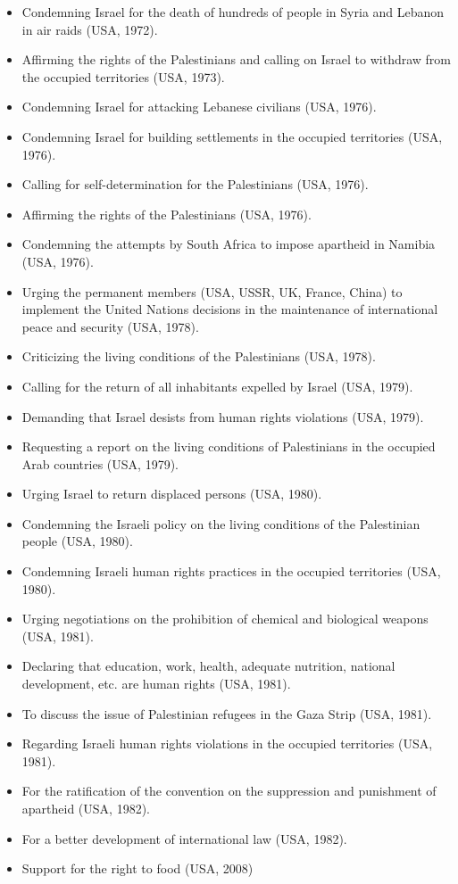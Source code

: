 \begin{itemize}
\item Condemning Israel for the death of hundreds of people in Syria and
Lebanon in air raids (USA, 1972).
\item Affirming the rights of the Palestinians and calling on Israel to
withdraw from the occupied territories (USA, 1973).
\item Condemning Israel for attacking Lebanese civilians (USA, 1976).
\item Condemning Israel for building settlements in the occupied territories
(USA, 1976).
\item Calling for self-determination for the Palestinians (USA, 1976).
\item Affirming the rights of the Palestinians (USA, 1976).
\item Condemning the attempts by South Africa to impose apartheid in Namibia
(USA, 1976).
\item Urging the permanent members (USA, USSR, UK, France, China) to
implement the United Nations decisions in the maintenance of international
peace and security (USA, 1978).
\item Criticizing the living conditions of the Palestinians (USA, 1978).
\item Calling for the return of all inhabitants expelled by Israel
(USA, 1979).
\item Demanding that Israel desists from human rights violations (USA, 1979).
\item Requesting a report on the living conditions of Palestinians in the
occupied Arab countries (USA, 1979).
\item Urging Israel to return displaced persons (USA, 1980).
\item Condemning the Israeli policy on the living conditions of the
Palestinian people (USA, 1980).
\item Condemning Israeli human rights practices in the occupied territories
(USA, 1980).
\item Urging negotiations on the prohibition of chemical and biological
weapons (USA, 1981).
\item Declaring that education, work, health, adequate nutrition, national
development, etc. are human rights (USA, 1981).
\item To discuss the issue of Palestinian refugees in the Gaza Strip
(USA, 1981).
\item Regarding Israeli human rights violations in the occupied territories
(USA, 1981).
\item For the ratification of the convention on the suppression and
punishment of apartheid (USA, 1982).
\item For a better development of international law (USA, 1982).
\item Support for the right to food (USA, 2008)
\end{itemize}

